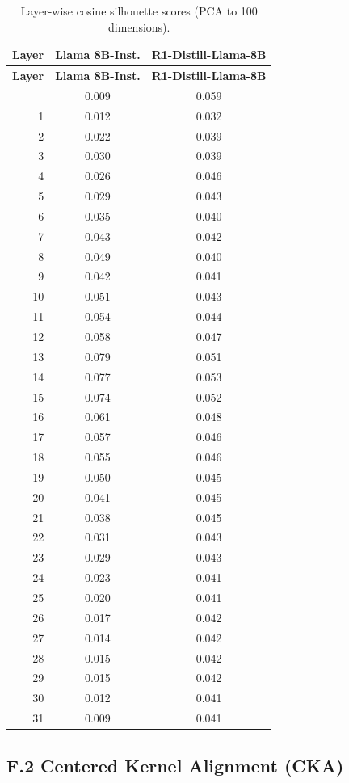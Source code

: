 \documentclass{article}
\begin{document}
\begin{longtable}{rcc}
\caption{Layer-wise cosine silhouette scores (PCA to 100 dimensions).}
\label{tab:silhouette_layers} \\
\toprule
\textbf{Layer} & \textbf{Llama 8B-Inst.} & \textbf{R1-Distill-Llama-8B} \\
\midrule
\endfirsthead
\toprule
\textbf{Layer} & \textbf{Llama 8B-Inst.} & \textbf{R1-Distill-Llama-8B} \\
\midrule
\endhead
\bottomrule
\endfoot
 0 & 0.009 & 0.059 \\
 1 & 0.012 & 0.032 \\
 2 & 0.022 & 0.039 \\
 3 & 0.030 & 0.039 \\
 4 & 0.026 & 0.046 \\
 5 & 0.029 & 0.043 \\
 6 & 0.035 & 0.040 \\
 7 & 0.043 & 0.042 \\
 8 & 0.049 & 0.040 \\
 9 & 0.042 & 0.041 \\
10 & 0.051 & 0.043 \\
11 & 0.054 & 0.044 \\
12 & 0.058 & 0.047 \\
13 & 0.079 & 0.051 \\
14 & 0.077 & 0.053 \\
15 & 0.074 & 0.052 \\
16 & 0.061 & 0.048 \\
17 & 0.057 & 0.046 \\
18 & 0.055 & 0.046 \\
19 & 0.050 & 0.045 \\
20 & 0.041 & 0.045 \\
21 & 0.038 & 0.045 \\
22 & 0.031 & 0.043 \\
23 & 0.029 & 0.043 \\
24 & 0.023 & 0.041 \\
25 & 0.020 & 0.041 \\
26 & 0.017 & 0.042 \\
27 & 0.014 & 0.042 \\
28 & 0.015 & 0.042 \\
29 & 0.015 & 0.042 \\
30 & 0.012 & 0.041 \\
31 & 0.009 & 0.041 \\
\end{longtable}

\subsection*{F.2 Centered Kernel Alignment (CKA)}
\end{document}
